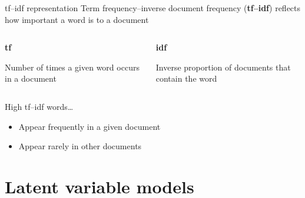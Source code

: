 \begin{frame}{tf--idf representation}
    Term frequency--inverse document frequency (\textbf{tf--idf}) reflects how
    important a word is to a document
    \vspace{-1em}
    \begin{columns}[t]
        \begin{column}{0.5\textwidth}
            \begin{center}
                \textbf{tf}
            \end{center}
            Number of times a given word occurs in a document
        \end{column}
        \begin{column}{0.5\textwidth}
            \begin{center}
                \textbf{idf}
            \end{center}
            Inverse proportion of documents that contain the word
        \end{column}
    \end{columns}
    \vfill\pause
    High tf--idf words\ldots\vspace{-0.5em}
    \begin{itemize}
        \item Appear frequently in a given document
        \item Appear rarely in other documents
    \end{itemize}
\end{frame}

\section{Latent variable models}

